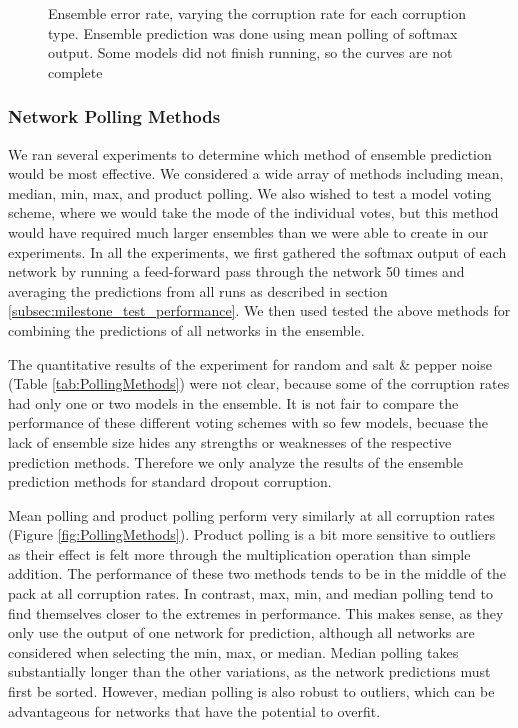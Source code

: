 \documentclass{article} %
\begin{document}
\begin{figure}[]
\begin{minipage}{.75\textwidth}
  \label{fig:ecr_sp}
\end{minipage}
\caption{Ensemble error rate, varying the corruption rate for each corruption type. Ensemble prediction was done using mean polling of softmax output. Some models did not finish running, so the curves are not complete}
\label{fig:ensemble_corruption_rate}
\end{figure}

\subsubsection{Network Polling Methods}

We ran several experiments to determine which method of ensemble prediction would be most effective. We considered a wide array of methods including mean, median, min, max, and product polling. We also wished to test a model voting scheme, where we would take the mode of the individual votes, but this method would have required much larger ensembles than we were able to create in our experiments. In all the experiments, we first gathered the softmax output of each network by running a feed-forward pass through the network 50 times and averaging the predictions from all runs as described in section \ref{subsec:milestone_test_performance}. We then used tested the above methods for combining the predictions of all networks in the ensemble.

The quantitative results of the experiment for random and salt \& pepper noise (Table \ref{tab:PollingMethods}) were not clear, because some of the corruption rates had only one or two models in the ensemble. It is not fair to compare the performance of these different voting schemes with so few models, becuase the lack of ensemble size hides any strengths or weaknesses of the respective prediction methods. Therefore we only analyze the results of the ensemble prediction methods for standard dropout corruption.

Mean polling and product polling perform very similarly at all corruption rates (Figure \ref{fig:PollingMethods}). Product polling is a bit more sensitive to outliers as their effect is felt more through the multiplication operation than simple addition. The performance of these two methods tends to be in the middle of the pack at all corruption rates. In contrast, max, min, and median polling tend to find themselves closer to the extremes in performance. This makes sense, as they only use the output of one network for prediction, although all networks are considered when selecting the min, max, or median. Median polling takes substantially longer than the other variations, as the network predictions must first be sorted. However, median polling is also robust to outliers, which can be advantageous for networks that have the potential to overfit.
\end{document}
